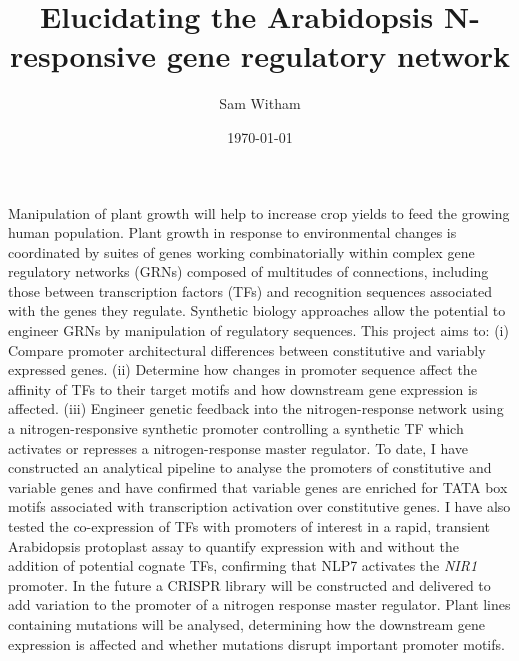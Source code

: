 \documentclass[11pt,a4paper]{report}
\renewenvironment{abstract}
	{{\bfseries\noindent{\abstractname}\par\nobreak}\footnotesize}
	{\bigskip}
\begin{document}
\title{Elucidating the Arabidopsis N-responsive gene regulatory network}



\author[1]{Sam Witham}%
%


\vspace{-1em}



\date{\today}


\begingroup{}
\let\center\flushleft{}
\let\endcenter\endflushleft{}
\maketitle{}
\endgroup{}
\begin{abstract}
	Manipulation of plant growth will help to increase crop yields to feed the growing human population.
	Plant growth in response to environmental changes is coordinated by suites of genes working combinatorially within complex gene regulatory networks (GRNs) composed of multitudes of connections, including those between transcription factors (TFs) and recognition sequences associated with the genes they regulate.
	Synthetic biology approaches allow the potential to engineer GRNs by manipulation of regulatory sequences.
	This project aims to: (i) Compare promoter architectural differences between constitutive and variably expressed genes.
	(ii) Determine how changes in promoter sequence affect the affinity of TFs to their target motifs and how downstream gene expression is affected.
	(iii) Engineer genetic feedback into the nitrogen\hyp{}response network using a nitrogen\hyp{}responsive synthetic promoter controlling a synthetic TF which activates or represses a nitrogen\hyp{}response master regulator.
	To date, I have constructed an analytical pipeline to analyse the promoters of constitutive and variable genes and have confirmed that variable genes are enriched for TATA box motifs associated with transcription activation over constitutive genes.
	I have also tested the co\hyp{}expression of TFs with promoters of interest in a rapid, transient Arabidopsis protoplast assay to quantify expression with and without the addition of potential cognate TFs, confirming that NLP7 activates the \textit{NIR1} promoter.
	In the future a CRISPR library will be constructed and delivered to add variation to the promoter of a nitrogen response master regulator. Plant lines containing mutations will be analysed, determining how the downstream gene expression is affected and whether mutations disrupt important promoter motifs.
\end{abstract}
\end{document}
